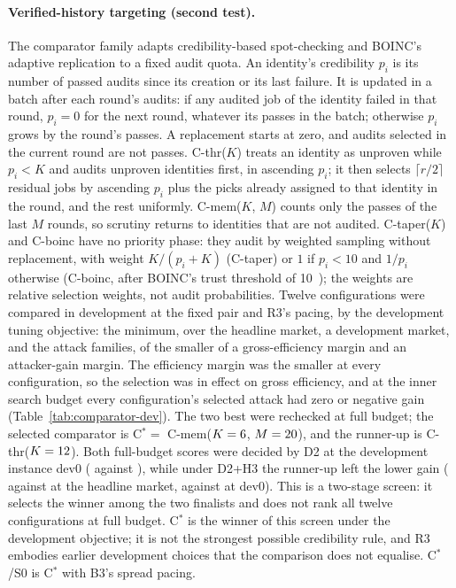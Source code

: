 \documentclass[11pt]{article}
\begin{document}
\paragraph{Verified-history targeting (second test).} The comparator family adapts credibility-based spot-checking and BOINC's adaptive replication to a fixed audit quota. An identity's credibility $p_i$ is its number of passed audits since its creation or its last failure. It is updated in a batch after each round's audits: if any audited job of the identity failed in that round, $p_i = 0$ for the next round, whatever its passes in the batch; otherwise $p_i$ grows by the round's passes. A replacement starts at zero, and audits selected in the current round are not passes. C-thr($K$) treats an identity as unproven while $p_i < K$ and audits unproven identities first, in ascending $p_i$; it then selects $\lceil r/2 \rceil$ residual jobs by ascending $p_i$ plus the picks already assigned to that identity in the round, and the rest uniformly. C-mem($K$, $M$) counts only the passes of the last $M$ rounds, so scrutiny returns to identities that are not audited. C-taper($K$) and C-boinc have no priority phase: they audit by weighted sampling without replacement, with weight $K/(p_i + K)$ (C-taper) or $1$ if $p_i < 10$ and $1/p_i$ otherwise (C-boinc, after BOINC's trust threshold of 10~\cite{boincwiki}); the weights are relative selection weights, not audit probabilities. Twelve configurations were compared in development at the fixed pair and R3's pacing, by the development tuning objective: the minimum, over the headline market, a development market, and the attack families, of the smaller of a gross-efficiency margin and an attacker-gain margin. The efficiency margin was the smaller at every configuration, so the selection was in effect on gross efficiency, and at the inner search budget every configuration's selected attack had zero or negative gain (Table~\ref{tab:comparator-dev}). The two best were rechecked at full budget; the selected comparator is C$^* = $ C-mem($K = 6$, $M = 20$), and the runner-up is C-thr($K = 12$). Both full-budget scores were decided by D2 at the development instance dev0 ( against ), while under D2+H3 the runner-up left the lower gain ( against  at the headline market,  against  at dev0). This is a two-stage screen: it selects the winner among the two finalists and does not rank all twelve configurations at full budget. C$^*$ is the winner of this screen under the development objective; it is not the strongest possible credibility rule, and R3 embodies earlier development choices that the comparison does not equalise. C$^*$/S0 is C$^*$ with B3's spread pacing.
\end{document}
